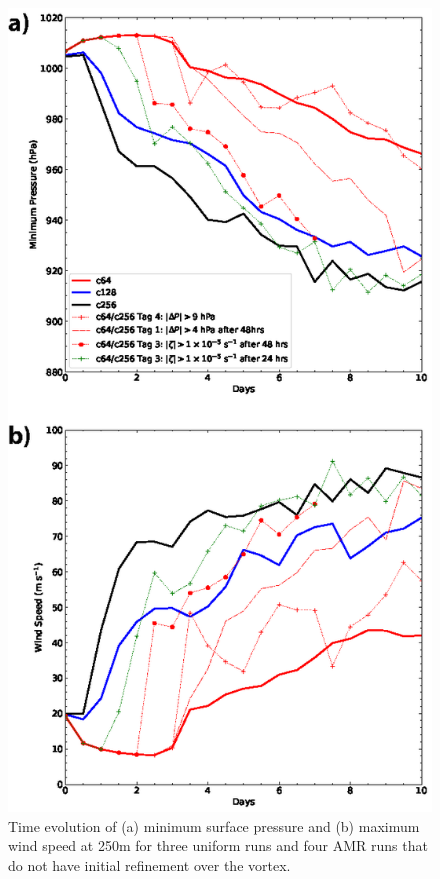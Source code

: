 \begin{figure}
    \centerline{%
    \noindent
    \includegraphics[height=.9\textheight]{Chap3/TC_delayed_plots-01.eps}}
    \caption{Time evolution of (a) minimum surface pressure and (b) maximum
    wind speed at 250m for three uniform runs and four AMR runs
    that do not have initial refinement over the vortex.
}%
    \label{fig:delayedplots}
\end{figure}


